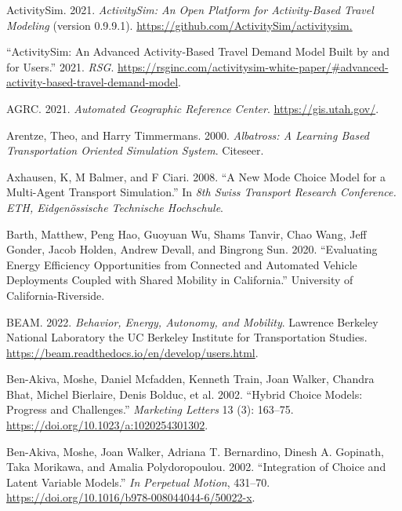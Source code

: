 \documentclass[12pt, oneside, openright]{byuthesis}
\newlength{\cslhangindent}
\newlength{\cslentryspacingunit} %
\newenvironment{CSLReferences}[2] %
 {%
  \setlength{\parindent}{0pt}
  \ifodd #1
  \let\oldpar\par
  \def\par{\hangindent=\cslhangindent\oldpar}
  \fi
  \setlength{\parskip}{#2\cslentryspacingunit}
 }%
 {}
\begin{document}
\hypertarget{refs}{}
\begin{CSLReferences}{1}{0}
\leavevmode{}%
ActivitySim. 2021. \emph{ActivitySim: An Open Platform for Activity-Based Travel Modeling} (version 0.9.9.1). \url{https://github.com/ActivitySim/activitysim.}

\leavevmode{}%
{``ActivitySim: An Advanced Activity-Based Travel Demand Model Built by and for Users.''} 2021. \emph{RSG}. \url{https://rsginc.com/activitysim-white-paper/\#advanced-activity-based-travel-demand-model}.

\leavevmode{}%
AGRC. 2021. \emph{Automated Geographic Reference Center}. \url{https://gis.utah.gov/}.

\leavevmode{}%
Arentze, Theo, and Harry Timmermans. 2000. \emph{Albatross: A Learning Based Transportation Oriented Simulation System}. Citeseer.

\leavevmode{}%
Axhausen, K, M Balmer, and F Ciari. 2008. {``A New Mode Choice Model for a Multi-Agent Transport Simulation.''} In \emph{8th Swiss Transport Research Conference. ETH, Eidgen{ö}ssische Technische Hochschule}.

\leavevmode{}%
Barth, Matthew, Peng Hao, Guoyuan Wu, Shams Tanvir, Chao Wang, Jeff Gonder, Jacob Holden, Andrew Devall, and Bingrong Sun. 2020. {``Evaluating Energy Efficiency Opportunities from Connected and Automated Vehicle Deployments Coupled with Shared Mobility in California.''} University of California-Riverside.

\leavevmode{}%
BEAM. 2022. \emph{Behavior, Energy, Autonomy, and Mobility}. Lawrence Berkeley National Laboratory the UC Berkeley Institute for Transportation Studies. \url{https://beam.readthedocs.io/en/develop/users.html}.

\leavevmode{}%
Ben-Akiva, Moshe, Daniel Mcfadden, Kenneth Train, Joan Walker, Chandra Bhat, Michel Bierlaire, Denis Bolduc, et al. 2002. {``Hybrid Choice Models: Progress and Challenges.''} \emph{Marketing Letters} 13 (3): 163--75. \url{https://doi.org/10.1023/a:1020254301302}.

\leavevmode{}%
Ben-Akiva, Moshe, Joan Walker, Adriana T. Bernardino, Dinesh A. Gopinath, Taka Morikawa, and Amalia Polydoropoulou. 2002. {``Integration of Choice and Latent Variable Models.''} \emph{In Perpetual Motion}, 431--70. \url{https://doi.org/10.1016/b978-008044044-6/50022-x}.


\end{CSLReferences}
\end{document}
